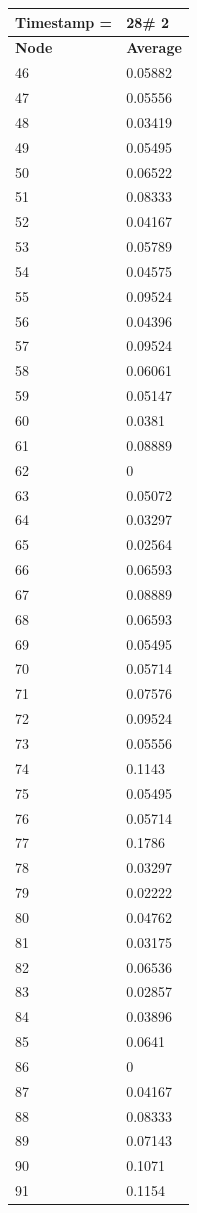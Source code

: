 \begin{tabular}{|l||l|}
\hline
\textbf{Timestamp =} & \textbf{28}\# 2\\\hline
	\textbf{Node} & \textbf{Average} \\ \hline
\hline
	46 & 0.05882 \\ \hline
	47 & 0.05556 \\ \hline
	48 & 0.03419 \\ \hline
	49 & 0.05495 \\ \hline
	50 & 0.06522 \\ \hline
	51 & 0.08333 \\ \hline
	52 & 0.04167 \\ \hline
	53 & 0.05789 \\ \hline
	54 & 0.04575 \\ \hline
	55 & 0.09524 \\ \hline
	56 & 0.04396 \\ \hline
	57 & 0.09524 \\ \hline
	58 & 0.06061 \\ \hline
	59 & 0.05147 \\ \hline
	60 & 0.0381 \\ \hline
	61 & 0.08889 \\ \hline
	62 & 0 \\ \hline
	63 & 0.05072 \\ \hline
	64 & 0.03297 \\ \hline
	65 & 0.02564 \\ \hline
	66 & 0.06593 \\ \hline
	67 & 0.08889 \\ \hline
	68 & 0.06593 \\ \hline
	69 & 0.05495 \\ \hline
	70 & 0.05714 \\ \hline
	71 & 0.07576 \\ \hline
	72 & 0.09524 \\ \hline
	73 & 0.05556 \\ \hline
	74 & 0.1143 \\ \hline
	75 & 0.05495 \\ \hline
	76 & 0.05714 \\ \hline
	77 & 0.1786 \\ \hline
	78 & 0.03297 \\ \hline
	79 & 0.02222 \\ \hline
	80 & 0.04762 \\ \hline
	81 & 0.03175 \\ \hline
	82 & 0.06536 \\ \hline
	83 & 0.02857 \\ \hline
	84 & 0.03896 \\ \hline
	85 & 0.0641 \\ \hline
	86 & 0 \\ \hline
	87 & 0.04167 \\ \hline
	88 & 0.08333 \\ \hline
	89 & 0.07143 \\ \hline
	90 & 0.1071 \\ \hline
	91 & 0.1154 \\ \hline
\end{tabular}

